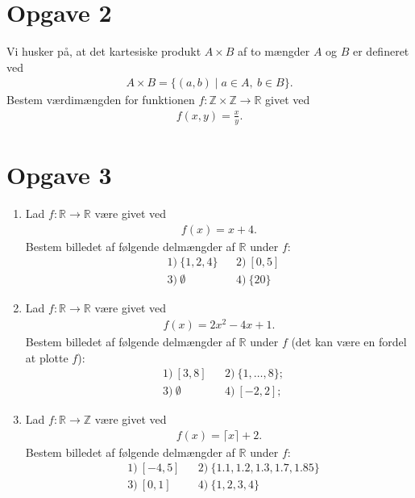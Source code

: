 \section*{Opgave 2}
Vi husker på, at det kartesiske produkt $A\times B$ af to mængder $A$ og $B$ er defineret ved
\begin{align*}
	A\times B = \{(a,b) \mid a\in A,\  b\in B\}.
\end{align*}
Bestem værdimængden for funktionen $f:\mathbb{Z}\times \mathbb{Z} \to \mathbb{R}$ givet ved
\begin{align*}
f(x,y) = \frac{x}{y}.
\end{align*}
\section*{Opgave 3}
\begin{enumerate}[label=\roman*)]
\item Lad $f:\mathbb{R} \to \mathbb{R}$ være givet ved
\begin{align*}
f(x) = x + 4.
\end{align*}
Bestem billedet af følgende delmængder af $\mathbb{R}$ under $f$:
\begin{align*}
&1) \ \{1,2,4\} &&2) \ [0,5]\\
&3) \ \emptyset &&4) \ \{20\}
\end{align*}
\item Lad $f: \mathbb{R} \to \mathbb{R}$ være givet ved 
\begin{align*}
f(x) = 2x^2-4x+1.
\end{align*}
Bestem billedet af følgende delmængder af $\mathbb{R}$ under $f$ (det kan være en fordel at plotte $f$):
\begin{align*}
&1)\  [3,8] &&2) \  \{1,\hdots, 8\};\\
&3)\  \emptyset &&4)\ [-2,2];
\end{align*}
\item Lad $f:\mathbb{R} \to \mathbb{Z}$ være givet ved
\begin{align*}
f(x) = \lceil x \rceil + 2.
\end{align*}
Bestem billedet af følgende delmængder af $\mathbb{R}$ under $f$:
\begin{align*}
&1) \ [-4,5]  &&2) \ \{1.1,1.2,1.3,1.7,1.85\}\\
&3) \ [0,1]  &&4) \ \{1,2,3,4\}\\
\end{align*}
\end{enumerate}

